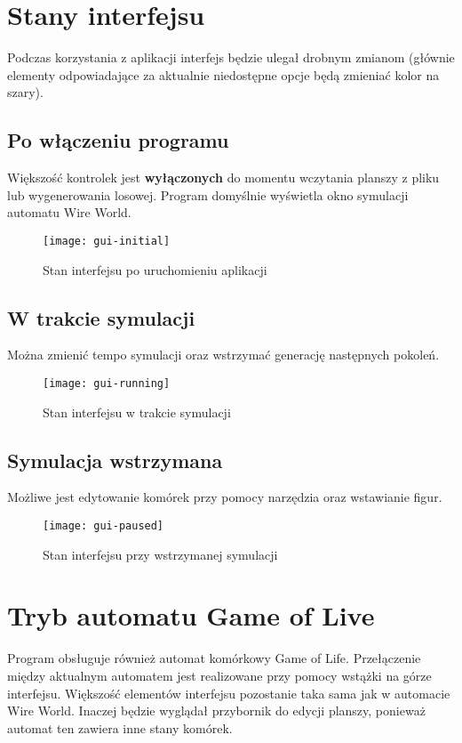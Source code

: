 \documentclass{report}
\begin{document}
\section{Stany interfejsu}
Podczas korzystania z aplikacji interfejs będzie ulegał drobnym zmianom (głównie elementy odpowiadające za aktualnie niedostępne opcje będą zmieniać kolor na szary).

\subsection{Po włączeniu programu}
Większość kontrolek jest \textbf{wyłączonych} do momentu wczytania planszy z pliku lub wygenerowania losowej. Program domyślnie wyświetla okno symulacji automatu Wire World.

\begin{figure}[H]
    \centering
    \texttt{[image: gui-initial]}
    \caption{Stan interfejsu po uruchomieniu aplikacji}
\end{figure}

\subsection{W trakcie symulacji}
Można zmienić tempo symulacji oraz wstrzymać generację następnych pokoleń.

\begin{figure}[H]
    \centering
    \texttt{[image: gui-running]}
    \caption{Stan interfejsu w trakcie symulacji}
\end{figure}

\subsection{Symulacja wstrzymana}
Możliwe jest edytowanie komórek przy pomocy narzędzia oraz wstawianie figur.

\begin{figure}[H]
    \centering
    \texttt{[image: gui-paused]}
    \caption{Stan interfejsu przy wstrzymanej symulacji}
\end{figure}

\section{Tryb automatu Game of Live}
Program obsługuje również automat komórkowy Game of Life. Przełączenie między aktualnym automatem jest realizowane przy pomocy wstążki na górze interfejsu.
Większość elementów interfejsu pozostanie taka sama jak w automacie Wire World. Inaczej będzie wyglądał przybornik do edycji planszy, ponieważ automat ten zawiera inne stany komórek.
\end{document}
